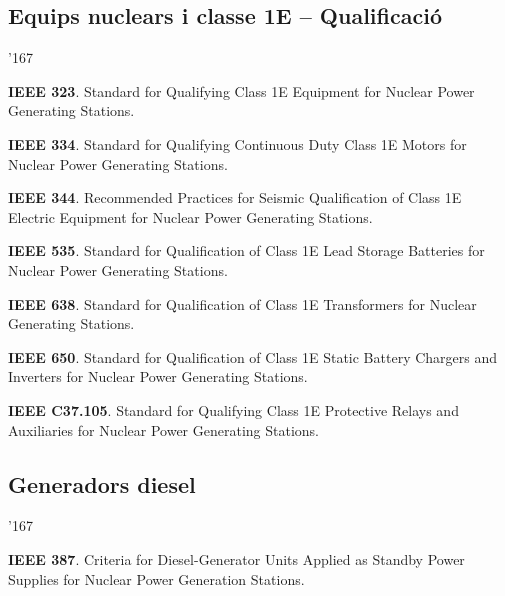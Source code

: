\subsection*{Equips nuclears i classe 1E -- Qualificaci\'{o}}
\begin{dinglist}{'167}
    \item \textbf{IEEE 323}. Standard for Qualifying Class 1E Equipment for Nuclear Power Generating Stations.
    \item \textbf{IEEE 334}. Standard for Qualifying Continuous Duty Class 1E Motors for Nuclear Power Generating Stations.
    \item \textbf{IEEE 344}. Recommended Practices for Seismic Qualification of Class 1E Electric Equipment for Nuclear Power Generating Stations.
    \item \textbf{IEEE 535}.  Standard for Qualification of Class 1E Lead Storage Batteries for Nuclear Power Generating Stations. 
    \item \textbf{IEEE 638}. Standard for Qualification of Class 1E Transformers for Nuclear Generating Stations.
    \item \textbf{IEEE 650}. Standard for Qualification of Class 1E Static Battery Chargers and Inverters for Nuclear Power Generating Stations.
    \item \textbf{IEEE C37.105}. Standard for Qualifying Class 1E Protective Relays and Auxiliaries for Nuclear Power Generating Stations.
\end{dinglist}


\subsection*{Generadors diesel}
\begin{dinglist}{'167}
    \item \textbf{IEEE 387}. Criteria for Diesel-Generator Units Applied as Standby Power Supplies for Nuclear Power Generation Stations.
\end{dinglist}


